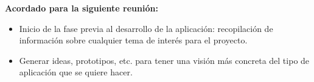 \textbf{Acordado para la siguiente reunión:}

\begin{itemize}
\item Inicio de la fase previa al desarrollo de la aplicación: recopilación de información sobre cualquier tema de interés para el proyecto.

\item Generar ideas, prototipos, etc. para tener una visión más concreta del tipo de aplicación que se quiere hacer.
\end{itemize}
